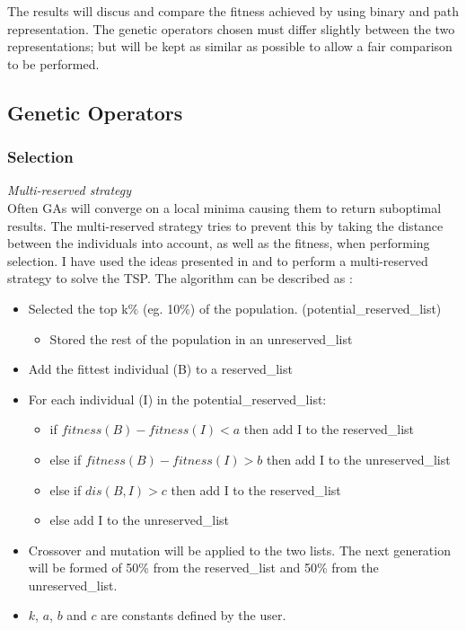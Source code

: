\documentclass[10pt,a4paper,openbib]{article}
\begin{document}
\begin{multicols}{2}
\noindent The results will discus and compare the fitness achieved by using binary and path representation. The genetic operators chosen must differ slightly between the two representations; but will be kept as similar as possible to allow a fair comparison to be performed.


\subsection{Genetic Operators} 

\subsubsection{Selection}

\textit{Multi-reserved strategy}\\

\noindent Often GAs will converge on a local minima causing them to return suboptimal results. The multi-reserved strategy tries to prevent this by taking the distance between the individuals into account, as well as the fitness, when performing selection. I have used the ideas presented in  \cite{IB_GA} and \cite{chen2008solving} to perform a multi-reserved strategy to solve the TSP. The algorithm can be described as :
\begin{itemize}
\item Selected the top k\% (eg. 10\%) of the population. (potential\_reserved\_list) 
	\begin{itemize}
	\item Stored the rest of the population in an unreserved\_list
	\end{itemize}
\item Add the fittest individual (B) to a reserved\_list
\item For each individual (I) in the potential\_reserved\_list:
	\begin{itemize}
	\item if $fitness(B)  - fitness(I) < a$ then add I to the reserved\_list
	\item else if $fitness(B)  - fitness(I) > b$ then add I to the unreserved\_list
	\item else if $dis(B, I) > c$ then add I to the reserved\_list
	\item else add I to the unreserved\_list
	\end{itemize}
\item Crossover and mutation will be applied to the two lists. The next generation will be formed of 50\% from the reserved\_list and 50\% from the unreserved\_list.
\item $k$, $a$, $b$ and $c$ are constants defined by the user.
\end{itemize}


\end{multicols}
\end{document}
